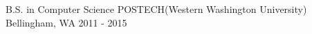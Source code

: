 

\begin{cventries}

  \cventry
    {B.S. in Computer Science} %
    {POSTECH(Western Washington University)} %
    {Bellingham, WA} %
    {2011 - 2015} %
    {
      \begin{cvitems} %
      \end{cvitems}
    }

\end{cventries}
